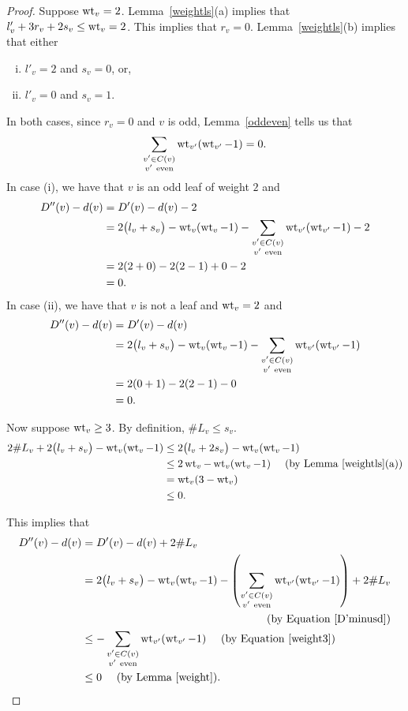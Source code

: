 \begin{proof}
Suppose $\operatorname{wt}_v = 2$. Lemma~\ref{weightls}(a) implies that $l'_v + 3r_v + 2s_v \leq \operatorname{wt}_v = 2 $. This implies that $r_v = 0$. Lemma~\ref{weightls}(b) implies that either 
\begin{enumerate}[(i)]
 \item $l'_v = 2$ and $s_v = 0$, or,
 \item $l'_v = 0$ and $s_v = 1$.
\end{enumerate}
In both cases, since $r_v = 0$ and $v$ is odd, Lemma~\ref{oddeven} tells us that 
\[ \sum_{\substack{v' \in C(v) \\ v' \ \textrm{even}}} \wt_{v'}(\wt_{v'}-1) = 0 .\]
In case (i), we have that $v$ is an odd leaf of weight $2$ and 
\begin{align*}
 D''(v) - d(v) &= D'(v) - d(v) - 2 \\
 &= 2 \big(l_v+s_v \big) - \operatorname{wt}_v(\operatorname{wt}_v-1) - \sum_{\substack{v' \in C(v) \\ v' \ \textrm{even}}} \operatorname{wt}_{v'}(\operatorname{wt}_{v'}-1) - 2 \\
 &= 2(2+0)-2(2-1)+0-2 \\
 &= 0. 
\end{align*}
In case (ii), we have that $v$ is not a leaf and $\operatorname{wt}_v = 2$ and 
\begin{align*}
D''(v) - d(v) &= D'(v)-d(v) \\
&= 2 \big(l_v+s_v \big) - \operatorname{wt}_v(\operatorname{wt}_v-1) - \sum_{\substack{v' \in C(v) \\ v' \ \textrm{even}}} \operatorname{wt}_{v'}(\operatorname{wt}_{v'}-1) \\
&= 2(0+1)-2(2-1)-0 \\
&= 0. 
\end{align*}

Now suppose $\operatorname{wt}_v \geq 3$. By definition, $\# L_v \leq s_v$. 
\begin{align}\label{weight3}
 2\# L_v + 2 \big(l_v+s_v \big) - \operatorname{wt}_v(\operatorname{wt}_v-1)  &\leq 2 \big(l_v+2s_v \big) -  \operatorname{wt}_v(\operatorname{wt}_v-1)  \\
 &\leq 2\operatorname{wt}_v-\operatorname{wt}_v(\operatorname{wt}_v-1) \ \ \ \ (\textup{by Lemma~\ref{weightls}(a)}) \nonumber \\
 &= \operatorname{wt}_v(3-\operatorname{wt}_v) \nonumber \\
 &\leq 0 \nonumber .
\end{align}
 
This implies that
\begin{align*}
 D''(v) - d(v) &= D'(v)-d(v)+2\# L_v \\
 &= 2 \big(l_v+s_v \big) -  \wt_v(\wt_v-1)  - \left( \sum_{\substack{v' \in C(v) \\ v' \ \textrm{even}}} \wt_{v'}(\wt_{v'}-1) \right) + 2\# L_v \\
 & \pushright{(\textup{by Equation~\ref{D'minusd}} )} \\
 &\leq  - \sum_{\substack{v' \in C(v) \\ v' \ \textrm{even}}} \wt_{v'}(\wt_{v'}-1) \ \ \ \ (\textup{by Equation~\ref{weight3}} )  \\
 &\leq 0 \ \ \ \ (\textup{by  Lemma  }\ref{weight}). 
\end{align*}


\end{proof}
